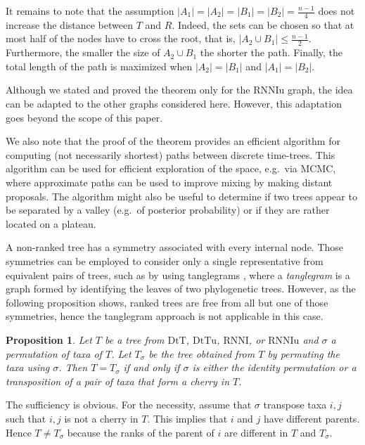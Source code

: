 \documentclass[11pt]{amsart}
\newtheorem{proposition}[lemma]{Proposition}
\theoremstyle{definition}
\newcommand{\rnni}{\mathrm{RNNI}}
\newcommand{\rnniu}{\mathrm{RNNIu}}
\newcommand{\dtt}{\mathrm{DtT}}
\newcommand{\dttu}{\mathrm{DtTu}}
\begin{document}
It remains to note that the assumption $|A_1| = |A_2| = |B_1| = |B_2| = \frac{n-1}{4}$ does not increase the distance between $T$ and $R$.
Indeed, the sets can be chosen so that at most half of the nodes have to cross the root, that is, $|A_2 \cup B_1| \le \frac{n-1}{2}$.
Furthermore, the smaller the size of $A_2 \cup B_1$ the shorter the path.
Finally, the total length of the path is maximized when $|A_2| = |B_1|$ and $|A_1| = |B_2|$.
\endproof

Although we stated and proved the theorem only for the $\rnniu$ graph, the idea can be adapted to the other graphs considered here.
However, this adaptation goes beyond the scope of this paper.

We also note that the proof of the theorem provides an efficient algorithm for computing (not necessarily shortest) paths between discrete time-trees.
This algorithm can be used for efficient exploration of the space, e.g.\ via MCMC, where approximate paths can be used to improve mixing by making distant proposals.
The algorithm might also be useful to determine if two trees appear to be separated by a valley (e.g.\ of posterior probability) or if they are rather located on a plateau.

A non-ranked tree has a symmetry associated with every internal node.
Those symmetries can be employed to consider only a single representative from equivalent pairs of trees, such as by using tanglegrams \autocite{Matsen2015-fn, Whidden2015-es}, where a \emph{tanglegram} is a graph formed by identifying the leaves of two phylogenetic trees.
However, as the following proposition shows, ranked trees are free from all but one of those symmetries, hence the tanglegram approach is not applicable in this case.

\begin{proposition}
Let $T$ be a tree from $\dtt$, $\dttu$, $\rnni$, or $\rnniu$ and $\sigma$ a permutation of taxa of $T$.
Let $T_\sigma$ be the tree obtained from $T$ by permuting the taxa using $\sigma$.
Then $T = T_\sigma$ if and only if $\sigma$ is either the identity permutation or a transposition of a pair of taxa that form a cherry in $T$.
\end{proposition}

\proof
The sufficiency is obvious.
For the necessity, assume that $\sigma$ transpose taxa $i,j$ such that $i,j$ is not a cherry in $T$.
This implies that $i$ and $j$ have different parents.
Hence $T \ne T_\sigma$ because the ranks of the parent of $i$ are different in $T$ and $T_\sigma$.
\endproof
\end{document}
